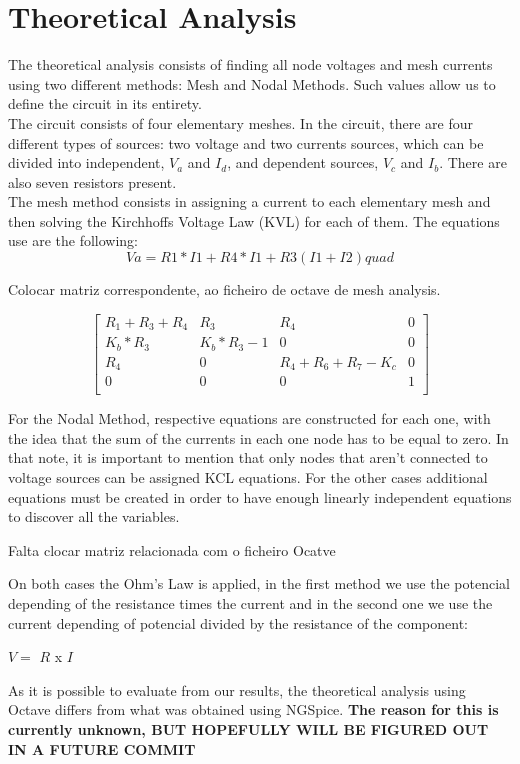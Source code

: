 \section{Theoretical Analysis}
\label{sec:analysis}

The theoretical analysis consists of finding all node voltages and mesh currents using two different methods: Mesh and Nodal Methods. Such values allow us to define the circuit in its entirety.\\

The circuit consists of four elementary meshes. In the circuit, there are four different types of sources: two voltage and two currents sources, which can be divided into independent, $V_a$ and $I_d$, and dependent sources, $V_c$ and $I_b$. There are also seven resistors present.\\

\vspace {1cm}
The mesh method consists in assigning a current to each elementary mesh and then solving the Kirchhoffs Voltage Law (KVL) for each of them. The equations use are the following: \[ Va=R1*I1+R4*I1+R3(I1+I2) quad \]

\vspace {1cm}

Colocar matriz correspondente, ao ficheiro de octave de mesh analysis. 

\vspace{1cm}

$$
\begin{bmatrix} 
R_1+R_3+R_4 & R_3       & R_4             & 0 \\       
K_b*R_3     & K_b*R_3-1 & 0               & 0 \\
R_4         &     0     & R_4+R_6+R_7-K_c & 0 \\
0           & 0         & 0               & 1 \\
\end {bmatrix} 
$$
\quad


For the Nodal Method, respective equations are constructed for each one, with the idea that the sum of the currents in each one node has to be equal to zero. In that note, it is important to mention that only nodes that aren't connected to voltage sources can be assigned KCL equations. For the other cases additional equations must be created in order to have enough linearly independent equations to discover all the variables. 

\vspace{1cm}

Falta clocar matriz relacionada com o ficheiro Ocatve 

\vspace {1cm}

On both cases the Ohm's Law is applied, in the first method we use the potencial depending of the resistance times the current and in the second one we use the current depending of potencial divided by the resistance of the component: 

\vspace{1cm}

$V =$  $R$ x $I$ 
\vspace{1cm} 

As it is possible to evaluate from our results, the theoretical analysis using Octave differs from what was obtained using NGSpice. \textbf{The reason for this is currently unknown, BUT HOPEFULLY WILL BE FIGURED OUT IN A FUTURE COMMIT}
